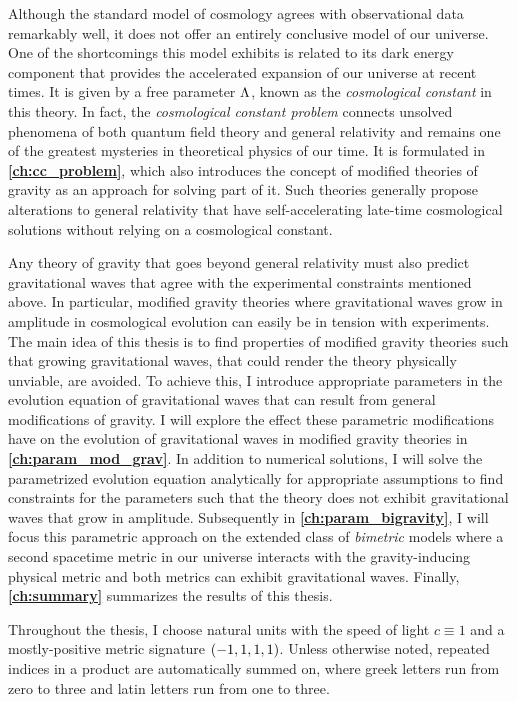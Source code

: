 Although the \LCDM{} standard model of cosmology agrees with observational data remarkably well, it does not offer an entirely conclusive model of our universe. One of the shortcomings this model exhibits is related to its dark energy component that provides the accelerated expansion of our universe at recent times. It is given by a free parameter \(\Lambda\), known as the \emph{cosmological constant} in this theory. In fact, the \emph{cosmological constant problem} connects unsolved phenomena of both quantum field theory and general relativity and remains one of the greatest mysteries in theoretical physics of our time. It is formulated in \textbf{\autoref{ch:cc_problem}}, which also introduces the concept of modified theories of gravity as an approach for solving part of it. Such theories generally propose alterations to general relativity that have self-accelerating late-time cosmological solutions without relying on a cosmological constant.

Any theory of gravity that goes beyond general relativity must also predict gravitational waves that agree with the experimental constraints mentioned above. In particular, modified gravity theories where gravitational waves grow in amplitude in cosmological evolution can easily be in tension with experiments. The main idea of this thesis is to find properties of modified gravity theories such that growing gravitational waves, that could render the theory physically unviable, are avoided. To achieve this, I introduce appropriate parameters in the evolution equation of gravitational waves that can result from general modifications of gravity. I will explore the effect these parametric modifications have on the evolution of gravitational waves in modified gravity theories in \textbf{\autoref{ch:param_mod_grav}}. In addition to numerical solutions, I will solve the parametrized evolution equation analytically for appropriate assumptions to find constraints for the parameters such that the theory does not exhibit gravitational waves that grow in amplitude. Subsequently in \textbf{\autoref{ch:param_bigravity}}, I will focus this parametric approach on the extended class of \emph{bimetric} models where a second spacetime metric in our universe interacts with the gravity-inducing physical metric and both metrics can exhibit gravitational waves. Finally, \textbf{\autoref{ch:summary}} summarizes the results of this thesis.

Throughout the thesis, I choose natural units with the speed of light \(c \equiv 1\) and a mostly-positive metric signature \(\del{-1,1,1,1}\). Unless otherwise noted, repeated indices in a product are automatically summed on, where greek letters run from zero to three and latin letters run from one to three.



